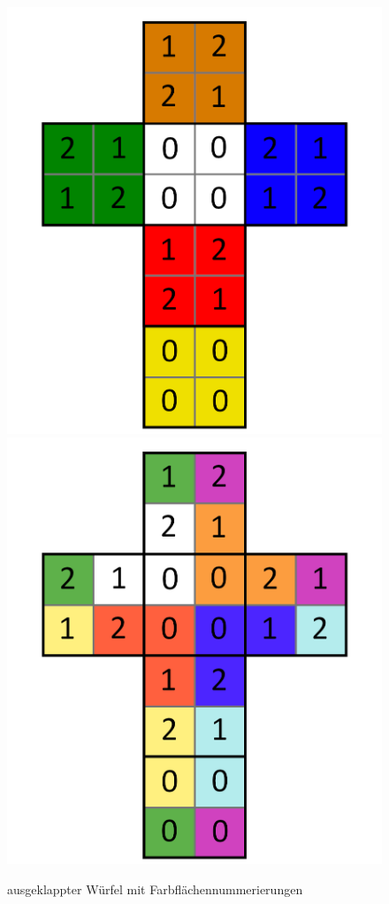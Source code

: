 \documentclass[12pt,a4paper, usenames, dvipsnames]{article}
\begin{document}
\begin{figure}[H]
\centering
\includegraphics[scale=0.1]{foldedout_012.png}
\includegraphics[scale=0.1]{foldedout_c_012.png}
\caption{ausgeklappter Würfel mit Farbflächennummerierungen}
\end{figure}
\end{document}
